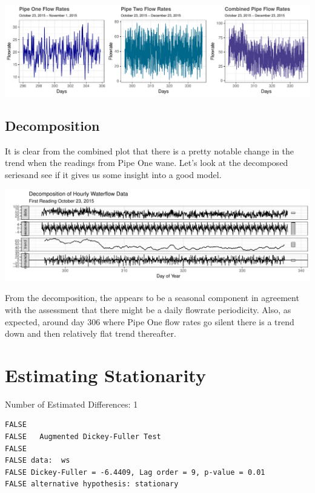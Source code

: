 \documentclass[openany]{book}
\begin{document}
\includegraphics{Part-C-BP_files/figure-latex/unnamed-chunk-2-1.pdf}

\hypertarget{decomposition}{%
\subsection{Decomposition}\label{decomposition}}

It is clear from the combined plot that there is a pretty notable change
in the trend when the readings from Pipe One wane. Let's look at the
decomposed seriesand see if it gives us some insight into a good model.

\includegraphics{Part-C-BP_files/figure-latex/unnamed-chunk-3-1.pdf}

From the decomposition, the appears to be a seasonal component in
agreement with the assessment that there might be a daily flowrate
periodicity. Also, as expected, around day 306 where Pipe One flow rates
go silent there is a trend down and then relatively flat trend
thereafter.

\hypertarget{estimating-stationarity}{%
\section{Estimating Stationarity}\label{estimating-stationarity}}

Number of Estimated Differences: 1

\begin{verbatim}
FALSE 
FALSE   Augmented Dickey-Fuller Test
FALSE 
FALSE data:  ws
FALSE Dickey-Fuller = -6.4409, Lag order = 9, p-value = 0.01
FALSE alternative hypothesis: stationary
\end{verbatim}
\end{document}
